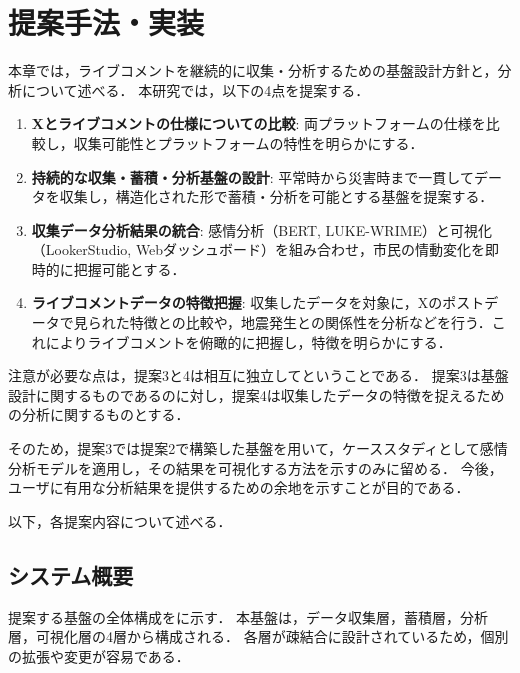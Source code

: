 \chapter{提案手法・実装}
  本章では，ライブコメントを継続的に収集・分析するための基盤設計方針と，分析について述べる．
  本研究では，以下の4点を提案する．

  \begin{enumerate}
    \item \textbf{Xとライブコメントの仕様についての比較}: 両プラットフォームの仕様を比較し，収集可能性とプラットフォームの特性を明らかにする．

    \item \textbf{持続的な収集・蓄積・分析基盤の設計}: 平常時から災害時まで一貫してデータを収集し，構造化された形で蓄積・分析を可能とする基盤を提案する．

    \item \textbf{収集データ分析結果の統合}: 感情分析（BERT, LUKE-WRIME）と可視化（LookerStudio, Webダッシュボード）を組み合わせ，市民の情動変化を即時的に把握可能とする．
  
    \item \textbf{ライブコメントデータの特徴把握}: 収集したデータを対象に，Xのポストデータで見られた特徴との比較や，地震発生との関係性を分析などを行う．これによりライブコメントを俯瞰的に把握し，特徴を明らかにする．
  \end{enumerate}

  注意が必要な点は，提案3と4は相互に独立してということである．
  提案3は基盤設計に関するものであるのに対し，提案4は収集したデータの特徴を捉えるための分析に関するものとする．
  
  そのため，提案3では提案2で構築した基盤を用いて，ケーススタディとして感情分析モデルを適用し，その結果を可視化する方法を示すのみに留める．
  今後，ユーザに有用な分析結果を提供するための余地を示すことが目的である．
  
  以下，各提案内容について述べる．

  \section{システム概要}

  提案する基盤の全体構成をに示す．
  本基盤は，データ収集層，蓄積層，分析層，可視化層の4層から構成される．
  各層が疎結合に設計されているため，個別の拡張や変更が容易である．

  

